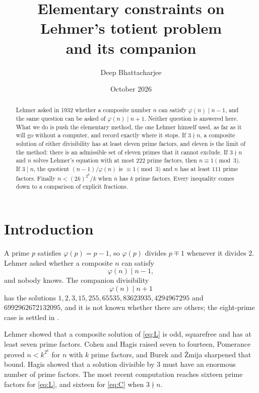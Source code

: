 \documentclass[11pt]{amsart}
\title{Elementary constraints on Lehmer's totient problem\\ and its companion}
\author{Deep Bhattacharjee}
\date{October 2026}
\theoremstyle{definition}
\theoremstyle{remark}
\begin{document}
\begin{abstract}
Lehmer asked in 1932 whether a composite number $n$ can satisfy
$\varphi(n)\mid n-1$, and the same question can be asked of
$\varphi(n)\mid n+1$. Neither question is answered here. What we do is
push the elementary method, the one Lehmer himself used, as far as it
will go without a computer, and record exactly where it stops. If
$3\nmid n$, a composite solution of either divisibility has at least
eleven prime factors, and eleven is the limit of the method: there is
an admissible set of eleven primes that it cannot exclude. If $3\nmid n$
and $n$ solves Lehmer's equation with at most $222$ prime factors, then
$n\equiv1\pmod 3$. If $3\mid n$, the quotient $(n-1)/\varphi(n)$ is
$\equiv1\pmod3$ and $n$ has at least $111$ prime factors. Finally
$n<(2k)^{2^{k}}/k$ when $n$ has $k$ prime factors. Every inequality comes
down to a comparison of explicit fractions.
\end{abstract}

\maketitle

\section{Introduction}

A prime $p$ satisfies $\varphi(p)=p-1$, so $\varphi(p)$ divides $p\mp1$
whenever it divides $2$. Lehmer \cite{Leh32} asked whether a composite
$n$ can satisfy
\begin{equation}\label{eq:L}
  \varphi(n)\mid n-1 ,
\end{equation}
and nobody knows. The companion divisibility
\begin{equation}\label{eq:C}
  \varphi(n)\mid n+1
\end{equation}
has the solutions $1,2,3,15,255,65535,83623935,4294967295$ and
$6992962672132095$, and it is not known whether there are others; the
eight-prime case is settled in \cite{MBB}.

Lehmer showed that a composite solution of \eqref{eq:L} is odd,
squarefree and has at least seven prime factors. Cohen and Hagis
\cite{CH80} raised seven to fourteen, Pomerance \cite{Pom77} proved
$n<k^{2^{k}}$ for $n$ with $k$ prime factors, and Burek and \.Zmija
\cite{BZ19} sharpened that bound. Hagis \cite{Hag88} showed that a
solution divisible by $3$ must have an enormous number of prime factors.
The most recent computation \cite{MBB} reaches sixteen prime factors for
\eqref{eq:L}, and sixteen for \eqref{eq:C} when $3\nmid n$.
\end{document}
